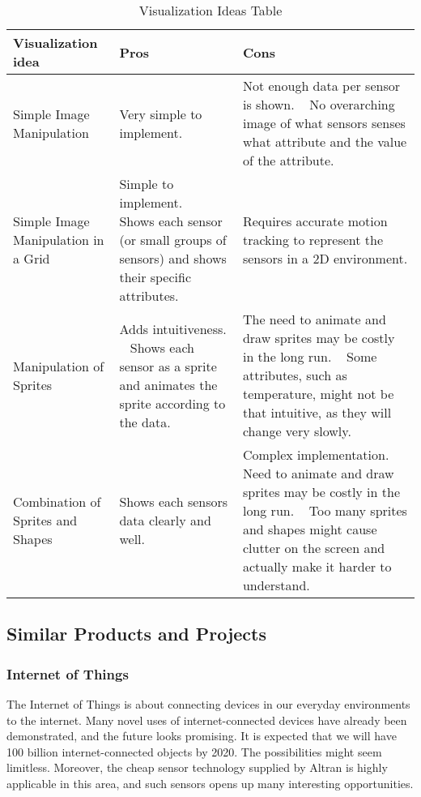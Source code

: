 \documentclass[../document]{subfiles}
\begin{document}
\begin{table}[H]
\centering
\caption{Visualization Ideas Table}
\begin{tabularx}{\textwidth}{|L{2.8cm}|X|X|}
	\hline	
	\textbf{Visualization idea}
	&\textbf{Pros}
	&\textbf{Cons}
	\\ \hline Simple Image Manipulation
	&Very simple to implement.
	&Not enough data per sensor is shown.
	\newline \ \newline
	No overarching image of what sensors senses what attribute and the value of the attribute.
	\\ \hline Simple Image Manipulation in a Grid
	&Simple to implement.
	\newline \ \newline
	Shows each sensor (or small groups of sensors) and shows their specific attributes.
	&Requires accurate motion tracking to represent the sensors in a 2D environment.
	\\ \hline Manipulation of Sprites
	&Adds intuitiveness.
	\newline \ \newline
	Shows each sensor as a sprite and animates the sprite according to the data.
	&The need to animate and draw sprites may be costly in the long run.
	\newline \ \newline
	Some attributes, such as temperature, might not be that intuitive, as they will change very slowly. 
	\\ \hline Combination of Sprites and Shapes
	&Shows each sensors data clearly and well.
	&Complex implementation.
	\newline \ \newline
	Need to animate and draw sprites may be costly in the long run.
	\newline \ \newline
	Too many sprites and shapes might cause clutter on the screen and actually make it harder to understand.
	\\ \hline 
\end{tabularx}
\end{table}

\subsection{Similar Products and Projects}
\subsubsection{Internet of Things}
The Internet of Things is about connecting devices in our everyday environments to the internet. Many novel uses of internet-connected devices have already been demonstrated, and the future looks promising. It is expected that we will have 100 billion internet-connected objects by 2020. The possibilities might seem limitless. Moreover, the cheap sensor technology supplied by \gls{Altran} is highly applicable in this area, and such sensors opens up many interesting opportunities.
\end{document}
